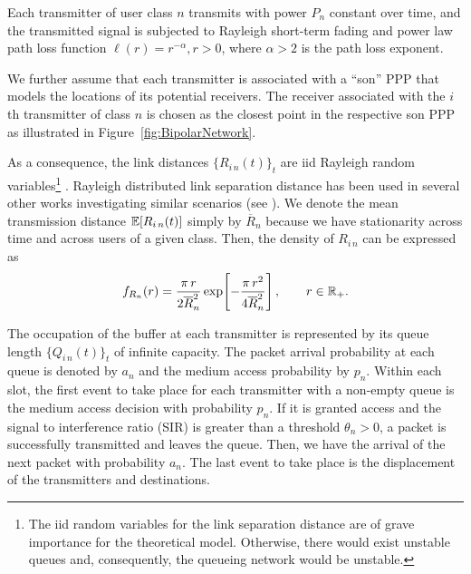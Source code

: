 Each transmitter of user class $n$ transmits with power $P_n$ constant over time, and the transmitted signal is subjected to Rayleigh short-term fading and power law path loss function $\ell(r) = r^{-\alpha}, r>0$, where $\alpha>2$ is the path loss exponent.

%
%
We further assume that each transmitter is associated with a ``son'' PPP that models the locations of its potential receivers. The receiver associated with the $i$th transmitter of class $n$ is chosen as the closest point in the respective son PPP as illustrated in Figure~\ref{fig:BipolarNetwork}.

As a consequence, the link distances $\{ R_{i\,n}(t) \}_t$ are iid Rayleigh random variables\footnote{The iid random variables for the link separation distance are of grave importance for the theoretical model. Otherwise, there would exist unstable queues and, consequently, the queueing network would be unstable.} \cite[Eq.~(2.35)]{kingman1992poisson}.
%
Rayleigh distributed link separation distance has been used in several other works investigating similar scenarios (see \cite{haenggi2013diversity}).
%
We denote the mean transmission distance ${\mathbb E}[R_{i\,n}(t)]$ simply by $\overline{R}_n$ because we have stationarity across time and across users of a given class. Then, the density of $R_{i\,n}$ can be expressed as
\begin{align*}
    f_{R_n}(r) = \frac{\pi\,r}{2 \overline{R}_n^2} \exp\!\left[ - \frac{\pi\,r^2}{4\overline{R}_n^2}\right], \qquad r\in{\mathbb R}_+.
\end{align*}

The occupation of the buffer at each transmitter is represented by its queue length $\{ Q_{i\,n}(t) \}_t$ of infinite capacity.
%
The packet arrival probability at each queue is denoted by $a_n$ and the medium access probability by $p_n$.
%
Within each slot, the first event to take place for each transmitter with a non-empty queue is the medium access decision with probability $p_n$. If it is granted access and the signal to interference ratio (SIR) %
is greater than a threshold $\theta_n>0$, a packet is successfully transmitted and leaves the queue. Then, we have the arrival of the next packet with probability $a_n$. The last event to take place is the displacement of the transmitters and destinations.

